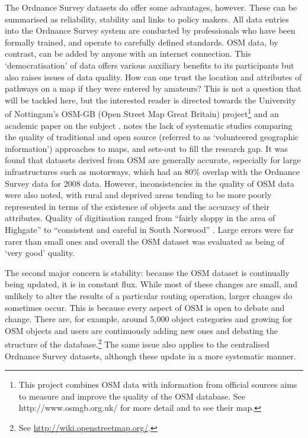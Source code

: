 The Ordnance Survey datasets do offer some advantages, however. These can be
summarised as reliability, stability and links to policy makers. All data
entries into the Ordnance Survey system are conducted by professionals who have
been formally trained, and operate to carefully defined standards. OSM data, by
contrast, can be added by anyone with an internet connection. This
`democratisation' of data offers various auxiliary benefits to its participants
\citep{Foresman2008} but also raises issues of data quality. How can one trust
the location and attributes of pathways on a map if they were entered by
amateurs? This is not a question that will be tackled here, but the interested
reader is directed towards the University of Nottingam's OSM-GB (Open Street
Map Great Britain) project\footnote{This project combines OSM data with
information from official sources aims to measure and improve the
quality of the OSM database. See http://www.osmgb.org.uk/ for more detail and
to see their map.} and an academic paper on the subject \citep{Haklay2010}.
\citet{Haklay2010} notes the lack of systematic studies comparing the quality
of traditional and open source (referred to as `volunteered geographic
information') approaches to maps, and sets-out to fill the research gap. It
was found that datasets derived from OSM are generally accurate, especially for large
infrastructures such as motorways, which had an 80\% overlap with the Ordnance
Survey data for 2008 data. However, inconsistencies in the quality of OSM data
were also noted, with rural and deprived areas tending to be more poorly represented in
terms of the existence of objects and the accuracy of their attributes.
Quality of digitisation ranged from ``fairly sloppy in the area of Highgate''
to ``consistent and careful in South Norwood'' \citep[p.~699]{Haklay2010}.
Large errors were far rarer than small ones and overall the OSM
dataset was evaluated as being of `very good' quality.

The second major concern is stability: because the OSM dataset is
continually being updated, it is in constant flux. While most of these changes
are small, and unlikely to alter the results of a particular routing operation,
larger changes do sometimes occur. This is because every aspect of OSM is open
to debate and change. There are, for example, around 5,000 object categories and
growing for OSM objects and users are continuously adding new ones and debating
the structure of the database.\footnote{See
\href{http://wiki.openstreetmap.org/wiki/Map_Features}{
http://wiki.openstreetmap.org/}.} The same issue also applies to the
centralised Ordnance Survey datasets, although these update in a more
systematic manner.

